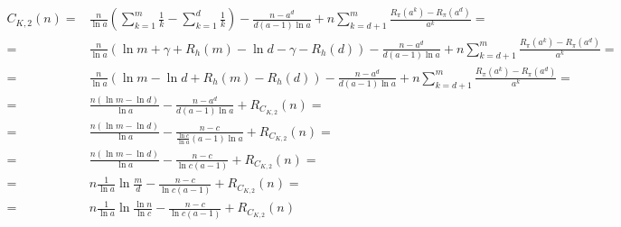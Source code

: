 \documentclass{article}
\begin{document}
\begin{align*}
C_{K,2}(n)
=& \frac{n}{\ln{a}} \left( \sum_{k=1}^{m} \frac{1}{k} - \sum_{k=1}^{d} \frac{1}{k} \right) - \frac{n - a^d}{d (a-1) \ln{a}} + n \sum_{k=d+1}^{m} \frac{R_{\pi}(a^k) - R_{\pi}(a^d)}{a^k} = \\
=& \frac{n}{\ln{a}} \left( \ln{m} + \gamma + R_h(m) - \ln{d} - \gamma - R_h(d) \right) - \frac{n - a^d}{d (a-1) \ln{a}} + n \sum_{k=d+1}^{m} \frac{R_{\pi}(a^k) - R_{\pi}(a^d)}{a^k} = \\
=& \frac{n}{\ln{a}} \left( \ln{m} - \ln{d} + R_h(m) - R_h(d) \right) - \frac{n - a^d}{d (a-1) \ln{a}} + n \sum_{k=d+1}^{m} \frac{R_{\pi}(a^k) - R_{\pi}(a^d)}{a^k} = \\
=& \frac{n ( \ln{m} - \ln{d} )}{\ln{a}} - \frac{n - a^d}{d (a-1) \ln{a}} + R_{C_{K,2}}(n) = \\
=& \frac{n ( \ln{m} - \ln{d} )}{\ln{a}} - \frac{n - c}{\frac{\ln{c}}{\ln{a}} (a-1) \ln{a}} + R_{C_{K,2}}(n) = \\
=& \frac{n ( \ln{m} - \ln{d} )}{\ln{a}} - \frac{n - c}{\ln{c} (a-1)} + R_{C_{K,2}}(n) = \\
=& n \frac{1}{\ln{a}} \ln{\frac{m}{d}} - \frac{n - c}{\ln{c} (a-1)} + R_{C_{K,2}}(n) = \\
=& n \frac{1}{\ln{a}} \ln{\frac{\ln{n}}{\ln{c}}} - \frac{n - c}{\ln{c} (a-1)} + R_{C_{K,2}}(n)
\end{align*}
\end{document}

